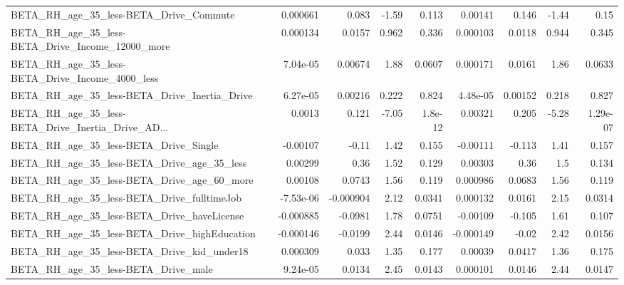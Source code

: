 \begin{tabular}{lrrrrrrrr}
BETA\_RH\_age\_35\_less-BETA\_Drive\_Commute             &    0.000661 &        0.083 &    -1.59 &    0.113 &    0.00141 &       0.146 &        -1.44 &          0.15 \\
BETA\_RH\_age\_35\_less-BETA\_Drive\_Income\_12000\_more   &    0.000134 &       0.0157 &    0.962 &    0.336 &   0.000103 &      0.0118 &        0.944 &         0.345 \\
BETA\_RH\_age\_35\_less-BETA\_Drive\_Income\_4000\_less    &    7.04e-05 &      0.00674 &     1.88 &   0.0607 &   0.000171 &      0.0161 &         1.86 &        0.0633 \\
BETA\_RH\_age\_35\_less-BETA\_Drive\_Inertia\_Drive       &    6.27e-05 &      0.00216 &    0.222 &    0.824 &   4.48e-05 &     0.00152 &        0.218 &         0.827 \\
BETA\_RH\_age\_35\_less-BETA\_Drive\_Inertia\_Drive\_AD... &      0.0013 &        0.121 &    -7.05 &  1.8e-12 &    0.00321 &       0.205 &        -5.28 &      1.29e-07 \\
BETA\_RH\_age\_35\_less-BETA\_Drive\_Single              &    -0.00107 &        -0.11 &     1.42 &    0.155 &   -0.00111 &      -0.113 &         1.41 &         0.157 \\
BETA\_RH\_age\_35\_less-BETA\_Drive\_age\_35\_less         &     0.00299 &         0.36 &     1.52 &    0.129 &    0.00303 &        0.36 &          1.5 &         0.134 \\
BETA\_RH\_age\_35\_less-BETA\_Drive\_age\_60\_more         &     0.00108 &       0.0743 &     1.56 &    0.119 &   0.000986 &      0.0683 &         1.56 &         0.119 \\
BETA\_RH\_age\_35\_less-BETA\_Drive\_fulltimeJob         &   -7.53e-06 &    -0.000904 &     2.12 &   0.0341 &   0.000132 &      0.0161 &         2.15 &        0.0314 \\
BETA\_RH\_age\_35\_less-BETA\_Drive\_haveLicense         &   -0.000885 &      -0.0981 &     1.78 &   0.0751 &   -0.00109 &      -0.105 &         1.61 &         0.107 \\
BETA\_RH\_age\_35\_less-BETA\_Drive\_highEducation       &   -0.000146 &      -0.0199 &     2.44 &   0.0146 &  -0.000149 &       -0.02 &         2.42 &        0.0156 \\
BETA\_RH\_age\_35\_less-BETA\_Drive\_kid\_under18         &    0.000309 &        0.033 &     1.35 &    0.177 &    0.00039 &      0.0417 &         1.36 &         0.175 \\
BETA\_RH\_age\_35\_less-BETA\_Drive\_male                &    9.24e-05 &       0.0134 &     2.45 &   0.0143 &   0.000101 &      0.0146 &         2.44 &        0.0147 \\

\end{tabular}
